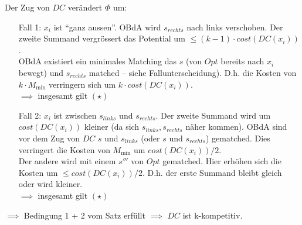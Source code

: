 Der Zug von $DC$ verändert $\Phi$ um:
\begin{itemize}
    \item[Fall 1:] $x_i$ ist ``ganz aussen''. OBdA wird $s_{rechts}$ nach links verschoben.
        Der zweite Summand vergrössert das Potential um $\leq (k-1) \cdot cost(DC(x_i))$.
        \\
        OBdA existiert ein minimales Matching das $s$ (von $Opt$ bereits nach $x_i$ bewegt)
        und $s_{rechts}$ matched -- siehe Fallunterscheidung).
        D.h. die Kosten von $k \cdot M_{\min}$ verringern sich um $k \cdot cost(DC(x_i))$.
        \\
        $\implies$ insgesamt gilt $(\star)$
    \item[Fall 2:] $x_i$ ist zwischen $s_{links}$ und $s_{rechts}$.
        Der zweite Summand wird um $cost(DC(x_i))$ kleiner (da sich $s_{links}, s_{rechts}$ näher kommen).
        OBdA sind vor dem Zug von $DC$ $s$ und $s_{links}$ (oder $s$ und $s_{rechts}$) gematched.
        Dies verringert die Kosten von $M_{\min}$ um $cost(DC(x_i))/2$.
        \\
        Der andere wird mit einem $s'''$ von $Opt$ gematched.
        Hier erhöhen sich die Kosten um $\leq cost(DC(x_i))/2$.
        D.h. der erste Summand bleibt gleich oder wird kleiner.
        \\
        $\implies$ insgesamt gilt $(\star)$
\end{itemize}
$\implies$ Bedingung 1 + 2 vom Satz erfüllt $\implies$ $DC$ ist k-kompetitiv.
